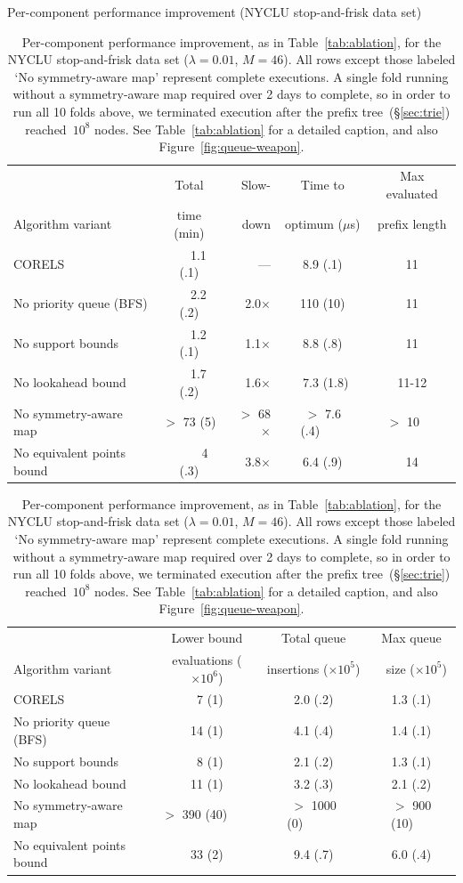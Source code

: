 \documentclass[twoside,11pt]{article}
\def\Reg{{\lambda}}
\begin{document}
\begin{table}[t!]
\centering
Per-component performance improvement (NYCLU stop-and-frisk data set) \\
\vspace{1mm}
\begin{tabular}{l | c  r | c | c}
& Total & Slow- & Time to & Max evaluated \\
Algorithm variant & time (min) & down & optimum ($\mu$s) & prefix length \\
\hline
CORELS & ~~~1.1 (.1) & --- & 8.9 (.1) & 11 \\
No priority queue (BFS) & ~~~2.2 (.2) & 2.0$\times$ & 110 (10) & 11 \\
No support bounds & ~~~1.2 (.1) & 1.1$\times$ & 8.8 (.8) & 11 \\
No lookahead bound & ~~~1.7 (.2) & 1.6$\times$ & ~7.3 (1.8) & 11-12 \\
No symmetry-aware map & $>$ 73 (5) & $>$ 68$\times$ & $>$ 7.6 (.4)~~~~ & $>$ 10~~~ \\
No equivalent points bound & ~~~~~4 (.3) & 3.8$\times$ & 6.4 (.9) & 14 \\
\hline
\end{tabular}
\begin{tabular}{l | c | c | c}
\hline
 & Lower bound & Total queue &  Max queue \\
Algorithm variant & evaluations ($\times 10^6$) & insertions ($\times 10^5$) &~ size ($\times 10^5$) \\
\hline
CORELS & ~7 (1) & 2.0 (.2) & 1.3 (.1) \\
No priority queue (BFS) & 14 (1) & 4.1 (.4) & 1.4 (.1) \\
No support bounds & ~8 (1) & 2.1 (.2) & 1.3 (.1) \\
No lookahead bound & 11 (1) & 3.2 (.3) & 2.1 (.2) \\
No symmetry-aware map & $>$ 390 (40)~~~~ & $>$ 1000 (0)~~~~~~ & $>$ 900 (10)~~~ \\
No equivalent points bound & 33 (2) & 9.4 (.7) & 6.0 (.4) \\
\end{tabular}
\caption{Per-component performance improvement, as in Table~\ref{tab:ablation},
for the NYCLU stop-and-frisk data set (${\Reg = 0.01}$, ${M = 46}$).
%
All rows except those labeled `No symmetry-aware map' represent complete executions.
%
A single fold running without a symmetry-aware map required over 2 days to complete,
so in order to run all 10 folds above, we terminated execution after the prefix tree~(\S\ref{sec:trie})
reached~$10^8$ nodes.
%
See Table~\ref{tab:ablation} for a detailed caption,
and also Figure~\ref{fig:queue-weapon}.
}
\vspace{4mm}
\label{tab:ablation-weapon}
\end{table}
\end{document}
